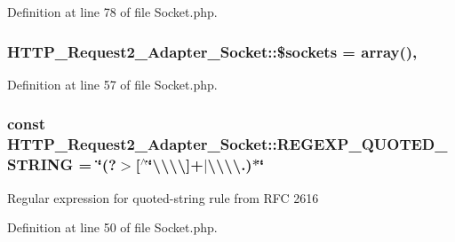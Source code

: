Definition at line 78 of file Socket.\+php.

\subsubsection[{\texorpdfstring{\$sockets}{$sockets}}]{\setlength{\rightskip}{0pt plus 5cm}H\+T\+T\+P\+\_\+\+Request2\+\_\+\+Adapter\+\_\+\+Socket\+::\$sockets = array()\hspace{0.3cm}{\ttfamily [static]}, {\ttfamily [protected]}}\hypertarget{classHTTP__Request2__Adapter__Socket_ac7d848682d9289b2c270abb214338455}{}\label{classHTTP__Request2__Adapter__Socket_ac7d848682d9289b2c270abb214338455}


Definition at line 57 of file Socket.\+php.

\subsubsection[{\texorpdfstring{R\+E\+G\+E\+X\+P\+\_\+\+Q\+U\+O\+T\+E\+D\+\_\+\+S\+T\+R\+I\+NG}{REGEXP_QUOTED_STRING}}]{\setlength{\rightskip}{0pt plus 5cm}const H\+T\+T\+P\+\_\+\+Request2\+\_\+\+Adapter\+\_\+\+Socket\+::\+R\+E\+G\+E\+X\+P\+\_\+\+Q\+U\+O\+T\+E\+D\+\_\+\+S\+T\+R\+I\+NG = \textquotesingle{}\char`\"{}(?$>$\mbox{[}$^\wedge$\char`\"{}\textbackslash{}\textbackslash{}\textbackslash{}\textbackslash{}\mbox{]}+$\vert$\textbackslash{}\textbackslash{}\textbackslash{}\textbackslash{}.)$\ast$\char`\"{}\textquotesingle{}}\hypertarget{classHTTP__Request2__Adapter__Socket_a6c107bbe3366105b84ab79ccedda35c9}{}\label{classHTTP__Request2__Adapter__Socket_a6c107bbe3366105b84ab79ccedda35c9}
Regular expression for \textquotesingle{}quoted-\/string\textquotesingle{} rule from R\+FC 2616 

Definition at line 50 of file Socket.\+php.

